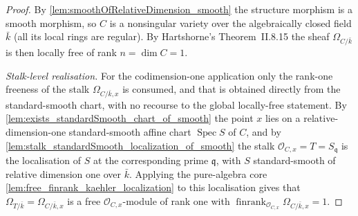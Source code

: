 \begin{proof}
  By \cref{lem:smoothOfRelativeDimension_smooth} the structure morphism is a
  smooth morphism, so \(C\) is a nonsingular variety over the algebraically
  closed field \(\bar k\) (all its local rings are regular). By Hartshorne's
  Theorem~II.8.15 the sheaf \(\Omega_{C/\bar k}\) is then locally free of
  rank \(n = \dim C = 1\).

  \emph{Stalk-level realisation.} For the codimension-one application only the
  rank-one freeness of the stalk \(\Omega_{C/\bar k, x}\) is consumed, and that
  is obtained directly from the standard-smooth chart, with no recourse to the
  global locally-free statement. By
  \cref{lem:exists_standardSmooth_chart_of_smooth} the point \(x\) lies on a
  relative-dimension-one standard-smooth affine chart
  \(\operatorname{Spec} S\) of \(C\), and by
  \cref{lem:stalk_standardSmooth_localization_of_smooth} the stalk
  \(\mathcal O_{C, x} = T = S_{\mathfrak q}\) is the localisation of \(S\) at
  the corresponding prime \(\mathfrak q\), with \(S\) standard-smooth of
  relative dimension one over \(\bar k\). Applying the pure-algebra core
  \cref{lem:free_finrank_kaehler_localization} to this localisation gives that
  \(\Omega_{T/\bar k} = \Omega_{C/\bar k, x}\) is a free
  \(\mathcal O_{C, x}\)-module of rank one with
  \(\operatorname{finrank}_{\mathcal O_{C, x}} \Omega_{C/\bar k, x} = 1\).
\end{proof}


